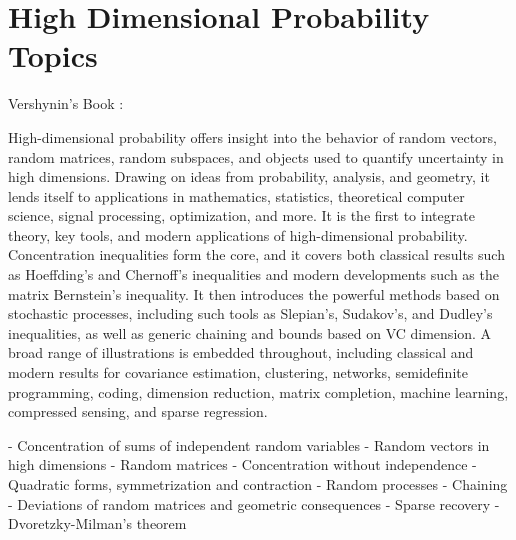 \section*{High  Dimensional Probability Topics}

Vershynin's Book :

High-dimensional probability offers insight into the behavior of random vectors, random matrices, random subspaces, and objects used to quantify uncertainty in high dimensions. Drawing on ideas from probability, analysis, and geometry, it lends itself to applications in mathematics, statistics, theoretical computer science, signal processing, optimization, and more. It is the first to integrate theory, key tools, and modern applications of high-dimensional probability. Concentration inequalities form the core, and it covers both classical results such as Hoeffding's and Chernoff's inequalities and modern developments such as the matrix Bernstein's inequality. It then introduces the powerful methods based on stochastic processes, including such tools as Slepian's, Sudakov's, and Dudley's inequalities, as well as generic chaining and bounds based on VC dimension. A broad range of illustrations is embedded throughout, including classical and modern results for covariance estimation, clustering, networks, semidefinite programming, coding, dimension reduction, matrix completion, machine learning, compressed sensing, and sparse regression.

- Concentration of sums of independent random variables
- Random vectors in high dimensions
- Random matrices
- Concentration without independence
- Quadratic forms, symmetrization and contraction
- Random processes
- Chaining
- Deviations of random matrices and geometric consequences
- Sparse recovery
- Dvoretzky-Milman's theorem







